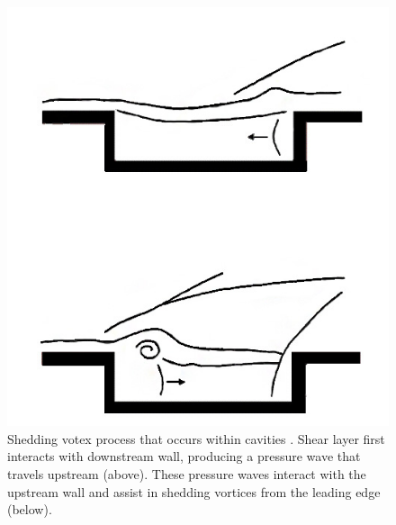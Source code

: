 \begin{figure}
\centering
\includegraphics[width=\textwidth]{Figures/SheddingVortices.jpg}
\caption[Shedding vortex process that occurs within cavities]{Shedding votex process that occurs within cavities \cite{ben2000experimental}. Shear layer first interacts with downstream wall, producing a pressure wave that travels upstream (above). These pressure waves interact with the upstream wall and assist in shedding vortices from the leading edge (below).}
\label{fig:vortex}
\end{figure}


